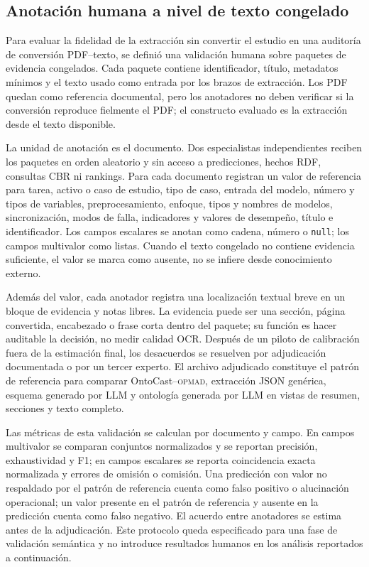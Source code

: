 \documentclass[11pt,a4paper]{article}
\newcommand{\OPMAD}{\textsc{opmad}}
\begin{document}
\subsection{Anotación humana a nivel de texto congelado}
\label{sec:human-annotation}

Para evaluar la fidelidad de la extracción sin convertir el estudio en una auditoría de conversión PDF--texto, se definió una validación humana sobre paquetes de evidencia congelados. Cada paquete contiene identificador, título, metadatos mínimos y el texto usado como entrada por los brazos de extracción. Los PDF quedan como referencia documental, pero los anotadores no deben verificar si la conversión reproduce fielmente el PDF; el constructo evaluado es la extracción desde el texto disponible.

La unidad de anotación es el documento. Dos especialistas independientes reciben los paquetes en orden aleatorio y sin acceso a predicciones, hechos RDF, consultas CBR ni rankings. Para cada documento registran un valor de referencia para tarea, activo o caso de estudio, tipo de caso, entrada del modelo, número y tipos de variables, preprocesamiento, enfoque, tipos y nombres de modelos, sincronización, modos de falla, indicadores y valores de desempeño, título e identificador. Los campos escalares se anotan como cadena, número o \texttt{null}; los campos multivalor como listas. Cuando el texto congelado no contiene evidencia suficiente, el valor se marca como ausente, no se infiere desde conocimiento externo.

Además del valor, cada anotador registra una localización textual breve en un bloque de evidencia y notas libres. La evidencia puede ser una sección, página convertida, encabezado o frase corta dentro del paquete; su función es hacer auditable la decisión, no medir calidad OCR. Después de un piloto de calibración fuera de la estimación final, los desacuerdos se resuelven por adjudicación documentada o por un tercer experto. El archivo adjudicado constituye el patrón de referencia para comparar OntoCast--\OPMAD{}, extracción JSON genérica, esquema generado por LLM y ontología generada por LLM en vistas de resumen, secciones y texto completo.

Las métricas de esta validación se calculan por documento y campo. En campos multivalor se comparan conjuntos normalizados y se reportan precisión, exhaustividad y F1; en campos escalares se reporta coincidencia exacta normalizada y errores de omisión o comisión. Una predicción con valor no respaldado por el patrón de referencia cuenta como falso positivo o alucinación operacional; un valor presente en el patrón de referencia y ausente en la predicción cuenta como falso negativo. El acuerdo entre anotadores se estima antes de la adjudicación. Este protocolo queda especificado para una fase de validación semántica y no introduce resultados humanos en los análisis reportados a continuación.
\end{document}

